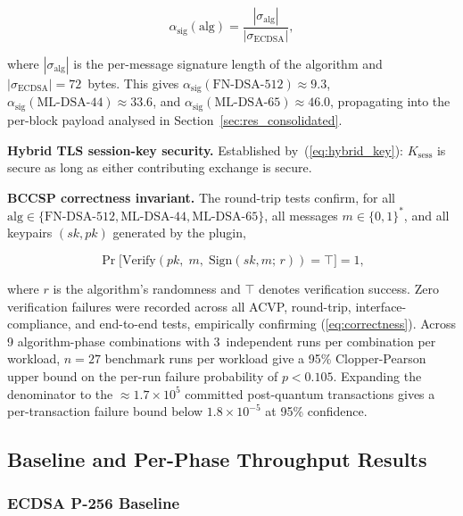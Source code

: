 \documentclass{ieeetj}
\begin{document}
\begin{equation}
\alpha_{\mathrm{sig}}(\mathrm{alg}) = \frac{|\sigma_{\mathrm{alg}}|}{|\sigma_{\mathrm{ECDSA}}|},
\label{eq:sig_amplification}
\end{equation}

where $|\sigma_{\mathrm{alg}}|$ is the per-message signature length of the
algorithm and $|\sigma_{\mathrm{ECDSA}}|=72$~bytes. This gives
$\alpha_{\mathrm{sig}}(\text{FN-DSA-512})\approx 9.3$,
$\alpha_{\mathrm{sig}}(\text{ML-DSA-44})\approx 33.6$, and
$\alpha_{\mathrm{sig}}(\text{ML-DSA-65})\approx 46.0$, propagating into the
per-block payload analysed in Section~\ref{sec:res_consolidated}.

\textbf{Hybrid TLS session-key security.} Established by~(\ref{eq:hybrid_key}):
$K_{\mathrm{sess}}$ is secure as long as either contributing exchange is secure.

\textbf{BCCSP correctness invariant.} The round-trip tests confirm, for all
$\mathrm{alg}\in\{\text{FN-DSA-512},\text{ML-DSA-44},\text{ML-DSA-65}\}$, all
messages $m\in\{0,1\}^*$, and all keypairs $(sk,pk)$ generated by the plugin,

\begin{equation}
\Pr\bigl[\mathrm{Verify}(pk,\;m,\;\mathrm{Sign}(sk,m;\,r))=\top\bigr]=1,
\label{eq:correctness}
\end{equation}

where $r$ is the algorithm's randomness and $\top$ denotes verification success.
Zero verification failures were recorded across all ACVP, round-trip,
interface-compliance, and end-to-end tests, empirically confirming
(\ref{eq:correctness}). Across 9 algorithm-phase combinations with 3~independent
runs per combination per workload, $n=27$ benchmark runs per workload give a 95\%
Clopper-Pearson upper bound on the per-run failure probability of $p<0.105$.
Expanding the denominator to the $\approx1.7\times10^{5}$ committed post-quantum
transactions gives a per-transaction failure bound below $1.8\times10^{-5}$ at
95\% confidence.

\subsection{Baseline and Per-Phase Throughput Results}
\label{sec:exp_results}

\subsubsection{ECDSA P-256 Baseline}
\end{document}

